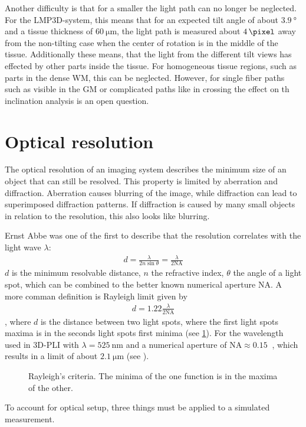 \par
%
Another difficulty is that for a smaller \Pixelsize{} the light path can no longer be neglected.
For the \ac{LMP3D}-system, this means that for an expected tilt angle of about $\SI{3.9}{\degree}$ and a tissue thickness of $\SI{60}{\micro\meter}$, the light path is measured about $\SI{4}{\pixel}$ away from the non-tilting case when the center of rotation is in the middle of the tissue.
Additionally these means, that the light from the different tilt views has effected by other parts inside the tissue.
For homogeneous tissue regions, such as parts in the dense \ac{WM}, this can be neglected.
However, for single fiber paths such as visible in the \ac{GM} or complicated paths like in crossing the effect on th inclination analysis is an open question.
%
%
%
\section{Optical resolution}
\label{sec:opticalResolution}
%
The optical resolution of an imaging system describes the minimum size of an object that can still be resolved.
This property is limited by aberration and diffraction.
Aberration causes blurring of the image, while diffraction can lead to superimposed diffraction patterns.
If diffraction is caused by many small objects in relation to the resolution, this also looks like blurring.
\par
%
Ernst Abbe was one of the first to describe that the resolution correlates with the light wave $\lambda$:
\begin{align}
d=\frac{ \lambda}{2 n \sin \theta} = \frac{\lambda}{2\mathrm{NA}} 
\end{align}
$d$ is the minimum resolvable distance, $n$ the refractive index, $\theta$ the angle of a light spot, which can be combined to the better known numerical aperture $\mathrm{NA}$.
A more comman definition is Rayleigh limit given by
\begin{align}
d=1.22\frac{\lambda}{2\mathrm{NA}} 
\end{align}
, where $d$ is the distance between two light spots, where the first light spots maxima is in the seconds light spots first minima (see \cref{fig:rayleigh}).
For the wavelength used in \ac{3D-PLI} with $\lambda = \SI{525}{\nano\meter}$ and a numerical aperture of $\mathrm{NA} \approx \SI{0.15}{}$ , which results in a limit of about $\SI{2.1}{\micro\meter}$ (see \cite{MenzelDissertation}).
%
\begin{figure}[!t]
\setlength{\tikzwidth}{0.5\textwidth}
\centering
\caption[Raylay criterium]{Rayleigh's criteria. The minima of the one function is in the maxima of the other.}
\label{fig:rayleigh}
\end{figure}
%
To account for optical setup, three things must be applied to a simulated measurement.
%
